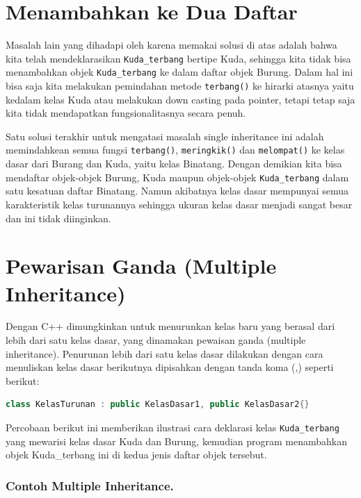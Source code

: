 \section{Menambahkan ke Dua Daftar}\label{menambahkan-ke-dua-daftar}

Masalah lain yang dihadapi oleh karena memakai solusi di atas adalah
bahwa kita telah mendeklarasikan \texttt{Kuda\_terbang} bertipe Kuda,
sehingga kita tidak bisa menambahkan objek \texttt{Kuda\_terbang} ke
dalam daftar objek Burung. Dalam hal ini bisa saja kita melakukan
pemindahan metode \texttt{terbang()} ke hirarki atasnya yaitu kedalam
kelas Kuda atau melakukan down casting pada pointer, tetapi tetap saja
kita tidak mendapatkan fungsionalitasnya secara penuh.

Satu solusi terakhir untuk mengatasi masalah single inheritance ini
adalah memindahkean semua fungsi \texttt{terbang()},
\texttt{meringkik()} dan \texttt{melompat()} ke kelas dasar dari Burang
dan Kuda, yaitu kelas Binatang. Dengan demikian kita bisa mendaftar
objek-objek Burung, Kuda maupun objek-objek \texttt{Kuda\_terbang} dalam
satu kesatuan daftar Binatang. Namun akibatnya kelas dasar mempunyai
semua karakteristik kelas turunannya sehingga ukuran kelas dasar menjadi
sangat besar dan ini tidak diinginkan.

\section{Pewarisan Ganda (Multiple
Inheritance)}\label{pewarisan-ganda-multiple-inheritance}

Dengan C++ dimungkinkan untuk menurunkan kelas baru yang berasal dari
lebih dari satu kelas dasar, yang dinamakan pewaisan ganda (multiple
inheritance). Penurunan lebih dari satu kelas dasar dilakukan dengan
cara menuliskan kelas dasar berikutnya dipisahkan dengan tanda koma (,)
seperti berikut:

\begin{lstlisting}[language=c++, numbers=none]
class KelasTurunan : public KelasDasar1, public KelasDasar2{}
\end{lstlisting}

Percobaan berikut ini memberikan ilustrasi cara deklarasi kelas
\texttt{Kuda\_terbang} yang mewarisi kelas dasar Kuda dan Burung,
kemudian program menambahkan objek Kuda\_terbang ini di kedua jenis
daftar objek tersebut.

\subsubsection*{Contoh Multiple Inheritance.}

